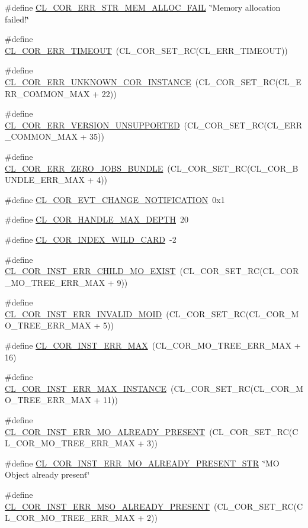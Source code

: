 \begin{CompactItemize}
\#define \hyperlink{group__group13_ga260}{CL\_\-COR\_\-ERR\_\-STR\_\-MEM\_\-ALLOC\_\-FAIL}~\char`\"{}Memory allocation failed!\char`\"{}
\item 
\#define \hyperlink{group__group13_ga155}{CL\_\-COR\_\-ERR\_\-TIMEOUT}~(CL\_\-COR\_\-SET\_\-RC(CL\_\-ERR\_\-TIMEOUT))
\item 
\#define \hyperlink{group__group13_ga177}{CL\_\-COR\_\-ERR\_\-UNKNOWN\_\-COR\_\-INSTANCE}~(CL\_\-COR\_\-SET\_\-RC(CL\_\-ERR\_\-COMMON\_\-MAX + 22))
\item 
\#define \hyperlink{group__group13_ga190}{CL\_\-COR\_\-ERR\_\-VERSION\_\-UNSUPPORTED}~(CL\_\-COR\_\-SET\_\-RC(CL\_\-ERR\_\-COMMON\_\-MAX + 35))
\item 
\#define \hyperlink{group__group13_ga250}{CL\_\-COR\_\-ERR\_\-ZERO\_\-JOBS\_\-BUNDLE}~(CL\_\-COR\_\-SET\_\-RC(CL\_\-COR\_\-BUNDLE\_\-ERR\_\-MAX + 4))
\item 
\#define \hyperlink{group__group13_ga319}{CL\_\-COR\_\-EVT\_\-CHANGE\_\-NOTIFICATION}~0x1
\item 
\#define \hyperlink{group__group13_ga287}{CL\_\-COR\_\-HANDLE\_\-MAX\_\-DEPTH}~20
\item 
\#define \hyperlink{group__group13_ga298}{CL\_\-COR\_\-INDEX\_\-WILD\_\-CARD}~-2
\item 
\#define \hyperlink{group__group13_ga209}{CL\_\-COR\_\-INST\_\-ERR\_\-CHILD\_\-MO\_\-EXIST}~(CL\_\-COR\_\-SET\_\-RC(CL\_\-COR\_\-MO\_\-TREE\_\-ERR\_\-MAX + 9))
\item 
\#define \hyperlink{group__group13_ga205}{CL\_\-COR\_\-INST\_\-ERR\_\-INVALID\_\-MOID}~(CL\_\-COR\_\-SET\_\-RC(CL\_\-COR\_\-MO\_\-TREE\_\-ERR\_\-MAX + 5))
\item 
\#define \hyperlink{group__group13_ga213}{CL\_\-COR\_\-INST\_\-ERR\_\-MAX}~(CL\_\-COR\_\-MO\_\-TREE\_\-ERR\_\-MAX + 16)
\item 
\#define \hyperlink{group__group13_ga211}{CL\_\-COR\_\-INST\_\-ERR\_\-MAX\_\-INSTANCE}~(CL\_\-COR\_\-SET\_\-RC(CL\_\-COR\_\-MO\_\-TREE\_\-ERR\_\-MAX + 11))
\item 
\#define \hyperlink{group__group13_ga203}{CL\_\-COR\_\-INST\_\-ERR\_\-MO\_\-ALREADY\_\-PRESENT}~(CL\_\-COR\_\-SET\_\-RC(CL\_\-COR\_\-MO\_\-TREE\_\-ERR\_\-MAX + 3))
\item 
\#define \hyperlink{group__group13_ga272}{CL\_\-COR\_\-INST\_\-ERR\_\-MO\_\-ALREADY\_\-PRESENT\_\-STR}~\char`\"{}MO Object already present\char`\"{}
\item 
\#define \hyperlink{group__group13_ga202}{CL\_\-COR\_\-INST\_\-ERR\_\-MSO\_\-ALREADY\_\-PRESENT}~(CL\_\-COR\_\-SET\_\-RC(CL\_\-COR\_\-MO\_\-TREE\_\-ERR\_\-MAX + 2))

\end{CompactItemize}
